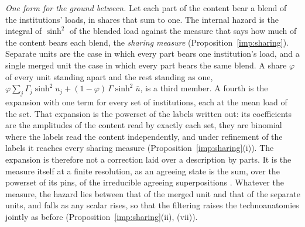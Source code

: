 \emph{One form for the ground between.} Let each part of the content
bear a blend of the institutions' loads, in shares that sum to one. The
internal hazard is the integral of $\sinh^2$ of the blended load against
the measure that says how much of the content bears each blend, the
\emph{sharing measure} (Proposition~\ref{imp:sharing}). Separate units are the case in which
every part bears one institution's load, and a single merged unit the
case in which every part bears the same blend. A share $\varphi$ of every
unit standing apart and the rest standing as one,
$\varphi\sum_j\Gamma_j\sinh^2u_j+(1-\varphi)\,\Gamma\sinh^2\bar u$, is a
third member. A fourth is the expansion with one term for every set of
institutions, each at the mean load of the set. That expansion is the
powerset of the labels written out: its coefficients are the amplitudes
of the content read by exactly each set, they are binomial where the
labels read the content independently, and under refinement of the labels
it reaches every sharing measure (Proposition~\ref{imp:sharing}(i)). The expansion is therefore
not a correction laid over a description by parts. It is the measure
itself at a finite resolution, as an agreeing state is the sum, over the
powerset of its pins, of the irreducible agreeing superpositions
\cite{Aethus}. Whatever the measure, the hazard lies between that of the
merged unit and that of the separate units, and falls as any scalar
rises, so that the filtering raises the technoanatomies jointly as before
(Proposition~\ref{imp:sharing}(ii), (vii)).

